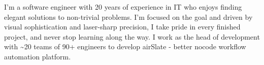 
\begin{cvparagraph}

I'm a software engineer with 20 years of experience in IT who enjoys
finding elegant solutions to non-trivial problems. I'm focused on the
goal and driven by visual sophistication and laser-sharp precision, I
take pride in every finished project, and never stop learning along
the way. I work as the head of development with \~{}20 teams of 90+
engineers to develop airSlate - better nocode workflow automation
platform.

\end{cvparagraph}
